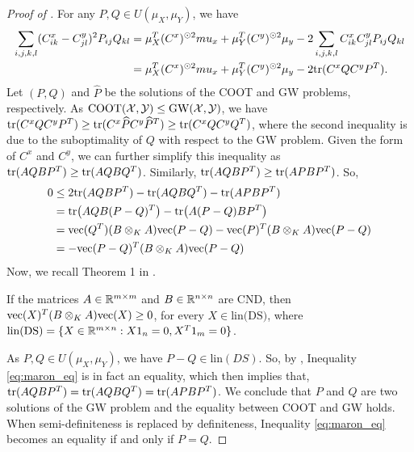 \begin{proof}[Proof of ]
  For any $P, Q \in U(\mu_X, \mu_Y)$, we have
  \begin{align}
    \sum_{i,j,k,l} (C^x_{ik} - C^y_{jl})^2 P_{ij} Q_{kl} &=
    \mu_X^T (C^x)^{\odot 2} mu_x + \mu_Y^T (C^y)^{\odot 2}\mu_y
      - 2 \sum_{i,j,k,l} C^x_{ik} C^y_{jl} P_{ij} Q_{kl} \\
    &= \mu_X^T (C^x)^{\odot 2} mu_x + \mu_Y^T (C^y)^{\odot 2}\mu_y - 2 \text{tr}(C^x Q C^y P^T).
  \end{align}
  Let $(P, Q)$ and $\widehat{P}$ be the solutions of the COOT and GW problems, respectively.
  As $\text{COOT}(\mathcal X, \mathcal Y) \leq \text{GW}(\mathcal X, \mathcal Y)$, we have
  $\text{tr}(C^x Q C^y P^T) \geq \text{tr}(C^x \widehat{P} C^y \widehat{P}^T) \geq \text{tr}(C^x Q C^y Q^T)$,
  where the second inequality is due to the suboptimality of $Q$ with respect to the GW problem.
  Given the form of $C^x$ and $C^y$, we can further simplify this inequality as
  $\text{tr}(A Q B P^T) \geq \text{tr}(A Q B Q^T)$. Similarly, $\text{tr}(A Q B P^T) \geq \text{tr}(A P B P^T)$. So,
  \begin{align} \label{eq:maron_eq}
    0 &\leq 2 \text{tr}(AQBP^T) - \text{tr}(AQBQ^T) - \text{tr}(APBP^T) \\
    &= \text{tr} \big( AQB (P-Q)^T \big) - \text{tr}\big( A(P-Q) B P^T \big) \\
    &= \text{vec}(Q^T) (B \otimes_K A) \text{vec}(P-Q) - \text{vec}(P)^T (B \otimes_K A) \text{vec}(P-Q) \\
    &= - \text{vec}(P-Q)^T (B \otimes_K A) \text{vec}(P-Q)
  \end{align}
  Now, we recall Theorem 1 in \citep{Maron18}.
  \begin{lemma} \label{lemma:maron}
    If the matrices $A \in \mathbb R^{m \times m}$ and $B \in \mathbb R^{n \times n}$
    are CND, then $\text{vec}(X)^T (B \otimes_K A) \text{vec}(X) \geq 0$, for every $X \in \text{lin(DS)}$,
    where $\text{lin(DS)} = \{X \in \mathbb R^{m \times n}: X 1_n = 0, X^T 1_m = 0 \}$.
  \end{lemma}
  As $P, Q \in U(\mu_X, \mu_Y)$, we have $P-Q \in \text{lin}(DS)$. So, by ,
  Inequality \eqref{eq:maron_eq} is in fact an equality, which then implies that,
  $\text{tr}(A Q B P^T) = \text{tr}(A Q B Q^T) = \text{tr}(A P B P^T)$.
  We conclude that $P$ and $Q$ are two solutions of the GW problem and
  the equality between COOT and GW holds. When semi-definiteness is replaced by definiteness,
  Inequality \eqref{eq:maron_eq} becomes an equality if and only if $P=Q$.
\end{proof}

